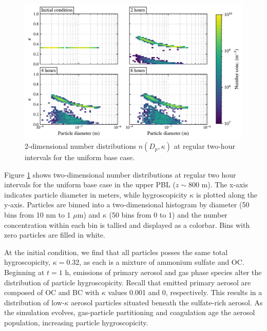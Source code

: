 \begin{figure}[!t]
  \centering
    \includegraphics[width=\textwidth]{figures/chapter5/2d-kappa-dist-4-panel-uniform-basecase-z40.pdf}
    \caption{2-dimensional number distributions $n(D_p, \kappa)$ at regular two-hour intervals for the uniform base case.}
    \label{fig:2d-kappa-dist-ub}
\end{figure}

Figure \ref{fig:2d-kappa-dist-ub} shows two-dimensional number distributions at regular two hour intervals for the uniform base case in the upper PBL ($z\sim800$ m). The x-axis indicates particle diameter in meters, while hygroscopicity $\kappa$ is plotted along the y-axis. Particles are binned into a two-dimensional histogram by diameter (50 bins from 10 nm to 1 $\mu$m) and $\kappa$ (50 bins from 0 to 1) and the number concentration within each bin is tallied and displayed as a colorbar. Bins with zero particles are filled in white.

At the initial condition, we find that all particles posses the same total hygroscopicity, $\kappa=0.32$, as each is a mixture of ammonium sulfate and OC. Beginning at $t=1$ h, emissions of primary aerosol and gas phase species alter the distribution of particle hygroscopicity. Recall that emitted primary aerosol are composed of OC and BC with $\kappa$ values 0.001 and 0, respectively. This results in a distribution of low-$\kappa$ aerosol particles situated beneath the sulfate-rich aerosol. As the simulation evolves, gas-particle partitioning and coagulation age the aerosol population, increasing particle hygroscopicity.

